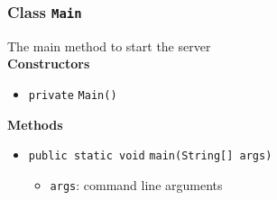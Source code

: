 \subsubsection{Class \lstinline|Main|}
The main method to start the server \\




\textbf{Constructors}
\begin{itemize}
\item \lstinline|private| \lstinline|Main|\lstinline|()|




\end{itemize}


\textbf{Methods}
\begin{itemize}
\item \lstinline|public static void| \lstinline|main|\lstinline|(String[] args)|

\begin{itemize}
\item \lstinline|args|: command line arguments
\end{itemize}



\end{itemize}



